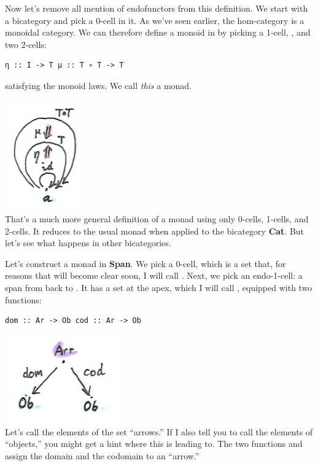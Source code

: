 Now let's remove all mention of endofunctors from this definition. We
start with a bicategory  and pick a 0-cell  in it.
As we've seen earlier, the hom-category  is a monoidal
category. We can therefore define a monoid in  by
picking a 1-cell, , and two 2-cells:

\begin{verbatim}
η :: I -> T μ :: T ∘ T -> T
\end{verbatim}

satisfying the monoid laws. We call \emph{this} a monad.

\includegraphics[width=1.39583in]{images/bimonad.png}\\
That's a much more general definition of a monad using only 0-cells,
1-cells, and 2-cells. It reduces to the usual monad when applied to the
bicategory \textbf{Cat}. But let's see what happens in other
bicategories.

Let's construct a monad in \textbf{Span}. We pick a 0-cell, which is a
set that, for reasons that will become clear soon, I will call
. Next, we pick an endo-1-cell: a span from  back
to . It has a set at the apex, which I will call ,
equipped with two functions:

\begin{verbatim}
dom :: Ar -> Ob cod :: Ar -> Ob
\end{verbatim}

\includegraphics[width=1.91667in]{images/spanmonad.png}\\
Let's call the elements of the set  ``arrows.'' If I also
tell you to call the elements of  ``objects,'' you might get
a hint where this is leading to. The two functions  and
 assign the domain and the codomain to an ``arrow.''

